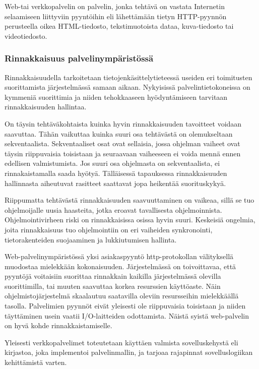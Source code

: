 \documentclass[12pt]{article}
\begin{document}
Web-tai verkkopalvelin on palvelin, jonka tehtävä on vastata Internetin
selaamiseen liittyviin pyyntöihin eli lähettämään tietyn HTTP-pyynnön
perusteella oikea HTML-tiedosto, tekstimuotoista dataa, kuva-tiedosto
tai videotiedosto.
\subsubsection{Rinnakkaisuus palvelinympäristössä}

Rinnakkaisuudella tarkoitetaan tietojenkäsittelytieteessä useiden
eri toimitusten suorittamista järjestelmässä samaan aikaan.
Nykyisissä palvelintietokoneissa on kymmeniä suorittimia ja niiden tehokkaaseen
hyödyntämiseen tarvitaan rinnakkaisuuden hallintaa.

On täysin tehtäväkohtaista
kuinka hyvin rinnakkaisuuden tavoitteet voidaan saavuttaa.
Tähän vaikuttaa kuinka suuri osa tehtävästä on olemukseltaan sekventaalista.
Sekventaaliset osat ovat sellaisia, jossa ohjelman vaiheet ovat täysin
riippuvaisia toisistaan ja seuraavaan vaiheeseen ei voida mennä ennen edellisen
valmistumista. Jos suuri osa ohjelmasta on sekventaalista, ei rinnakaistamalla
saada hyötyä. Tälläisessä tapauksessa rinnakkaisuuden hallinnasta aiheutuvat
rasitteet saattavat jopa heikentää suorituskykyä.

Riippumatta tehtävästä rinnakkaisuuden saavuuttaminen on vaikeaa,
sillä se tuo ohjelmoijalle uusia haasteita, jotka eroavat tavallisesta
ohjelmoinnista. Ohjelmointivirheen riski on rinnakkaisissa osissa hyvin suuri.
Keskeisiä ongelmia, joita rinnakkaisuus tuo ohjelmointiin on eri vaiheiden
synkronointi, tietorakenteiden suojaaminen ja lukkiutumisen hallinta.

Web-palvelinympäristössä yksi asiakaspyyntö http-protokollan välityksellä
muodostaa mielekkään kokonaisuuden.
Järjestelmässä on toivoittavaa, että pyyntöjä voitaisiin suorittaa
rinnakkain kaikilla järjestelmässä olevilla suorittimilla, tai muuten 
saavuttaa korkea resurssien käyttöaste.
Näin ohjelmistojärjestelmä skaalautuu saatavilla oleviin resursseihin
mielekkäällä tasolla. Palvelimien pyynnöt eivät yleisesti ole riippuvaisia
toisistaan ja niiden täyttäminen usein vaatii I/O-laitteiden odottamista.
Näistä syistä web-palvelin on hyvä kohde rinnakkaistamiselle.

Yleisesti verkkopalvelimet toteutetaan käyttäen valmista sovelluskehystä eli kirjastoa,
joka implementoi palvelinmallin, ja tarjoaa rajapinnat sovelluslogiikan
kehittämistä varten.
\end{document}
